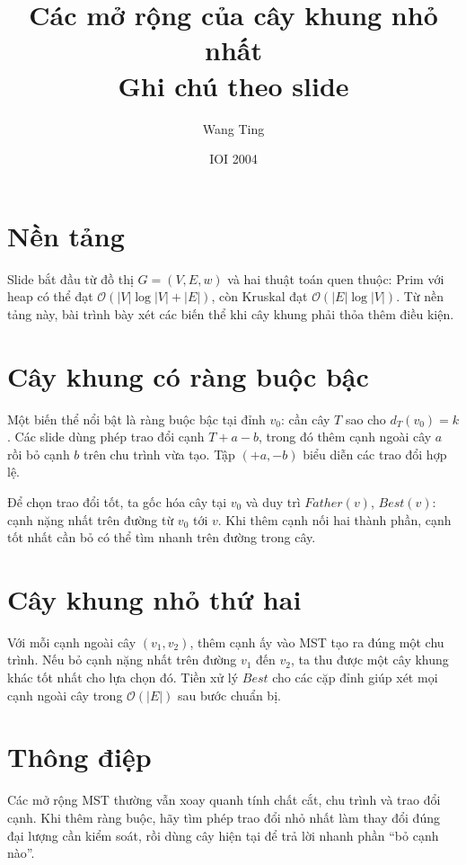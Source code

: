 \documentclass[11pt]{article}
\title{Các mở rộng của cây khung nhỏ nhất\\{\large Ghi chú theo slide}}
\author{Wang Ting}
\date{IOI 2004}
\newcommand{\Oh}{\mathcal{O}}
\begin{document}
\maketitle


\section{Nền tảng}

Slide bắt đầu từ đồ thị \(G=(V,E,w)\) và hai thuật toán quen thuộc:
Prim với heap có thể đạt \(\Oh(|V|\log |V|+|E|)\), còn Kruskal đạt
\(\Oh(|E|\log |V|)\). Từ nền tảng này, bài trình bày xét các biến thể khi
cây khung phải thỏa thêm điều kiện.

\section{Cây khung có ràng buộc bậc}

Một biến thể nổi bật là ràng buộc bậc tại đỉnh \(v_0\): cần cây \(T\) sao cho
\(d_T(v_0)=k\). Các slide dùng phép trao đổi cạnh \(T+a-b\), trong đó thêm
cạnh ngoài cây \(a\) rồi bỏ cạnh \(b\) trên chu trình vừa tạo. Tập
\((+a,-b)\) biểu diễn các trao đổi hợp lệ.

Để chọn trao đổi tốt, ta gốc hóa cây tại \(v_0\) và duy trì
\(\mathit{Father}(v)\), \(\mathit{Best}(v)\): cạnh nặng nhất trên đường từ
\(v_0\) tới \(v\). Khi thêm cạnh nối hai thành phần, cạnh tốt nhất cần bỏ
có thể tìm nhanh trên đường trong cây.

\section{Cây khung nhỏ thứ hai}

Với mỗi cạnh ngoài cây \((v_1,v_2)\), thêm cạnh ấy vào MST tạo ra đúng một
chu trình. Nếu bỏ cạnh nặng nhất trên đường \(v_1\) đến \(v_2\), ta thu được
một cây khung khác tốt nhất cho lựa chọn đó. Tiền xử lý \(\mathit{Best}\) cho
các cặp đỉnh giúp xét mọi cạnh ngoài cây trong \(\Oh(|E|)\) sau bước chuẩn
bị.

\section{Thông điệp}

Các mở rộng MST thường vẫn xoay quanh tính chất cắt, chu trình và trao đổi
cạnh. Khi thêm ràng buộc, hãy tìm phép trao đổi nhỏ nhất làm thay đổi đúng
đại lượng cần kiểm soát, rồi dùng cây hiện tại để trả lời nhanh phần ``bỏ
cạnh nào''.
\end{document}
